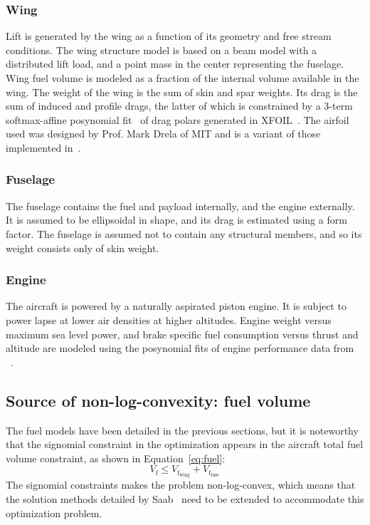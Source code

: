 \subsubsection{Wing}

Lift is generated by the wing as a function of its geometry and free stream conditions.
The wing structure model is based on a beam model with a distributed lift load,
and a point mass in the center representing the fuselage.
Wing fuel volume is modeled as a fraction of the internal volume available in the wing.
The weight of the wing is the sum of skin and spar weights.
Its drag is the sum of induced and profile drags, the latter of which is
constrained by a 3-term softmax-affine posynomial fit~\cite{Hoburg2016} of drag polars
generated in XFOIL~\cite{XFOIL}.
The airfoil used was designed by Prof. Mark Drela of MIT and
is a variant of those implemented in~\cite{Burton2018}.

\subsubsection{Fuselage}

The fuselage contains the fuel and payload internally, and the engine externally.
It is assumed to be ellipsoidal in shape, and its drag is estimated using a form factor.
The fuselage is assumed not to contain any structural members, and so its weight consists only of skin weight.

\subsubsection{Engine}

The aircraft is powered by a naturally aspirated piston engine. It is subject to
power lapse at lower air densities at higher altitudes. Engine weight versus maximum sea level power,
and brake specific fuel consumption versus thrust and altitude
are modeled using the posynomial fits of engine performance data from ~\cite{Ozturk2017}.

\subsection{Source of non-log-convexity: fuel volume}
The fuel models have been detailed in the previous sections, but it is noteworthy that
the signomial constraint in the optimization appears in the aircraft total fuel volume constraint,
as shown in Equation~\ref{eq:fuel}:
\begin{equation}
\label{eq:fuel}
V_{\mathrm{f}} \leq V_{\mathrm{f_{wing}}} + V_{\mathrm{f_{fuse}}}
\end{equation}
The signomial constraints makes the problem non-log-convex, which means that the solution methods
detailed by Saab~\cite{Saab2018} need to be extended to accommodate this optimization problem.
